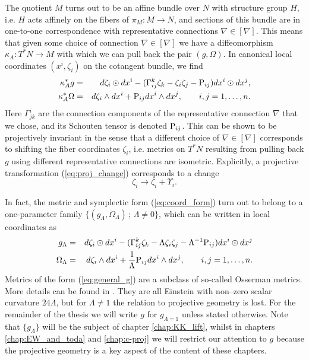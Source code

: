 \begin{rmk}
The quotient $M$ turns out to be an affine bundle over $N$ with
structure group $H$, i.e. $H$ acts affinely on the fibers of $\pi_M:M\rightarrow N$,
and sections of this bundle are in one-to-one correspondence with
representative connections $\nabla\in[\nabla]$. This means that given
some choice of connection $\nabla\in[\nabla]$ we have a diffeomorphism
$\kappa_A:T^{*}N\rightarrow M$ with which we can pull back the pair
$(g,\Omega)$. In canonical local coordinates $(x^{i},\zeta_{i})$ on
the cotangent bundle, we find
\begin{eqnarray}
\kappa_A^{*}g & = &  d\zeta_{i}\odot dx^{i}-(\Gamma_{ij}^{k}\zeta_{k}-\zeta_{i}\zeta_{j}-\mathrm{P}_{ij}) dx^{i}\odot dx^{j},\label{eq:coord_form}\\
\kappa_A^{*}\Omega & = &  d\zeta_{i}\wedge dx^{i}+\mathrm{P}_{ij} dx^{i}\wedge dx^{j},\qquad i,j=1,\dots ,n.\nonumber 
\end{eqnarray}
Here $\Gamma_{jk}^{i}$ are the connection components of the representative
connection $\nabla$ that we chose, and its Schouten tensor is denoted $\mathrm{P}_{ij}$. This can be shown to be projectively invariant
in the sense that a different choice of $\nabla\in[\nabla]$ corresponds
to shifting the fiber coordinates $\zeta_{i}$, i.e. metrics on $T^{*}N$
resulting from pulling back $g$ using different representative connections
are isometric. Explicitly, a projective transformation (\ref{eq:proj_change})
corresponds to a change
\begin{equation}
\zeta_{i}\longrightarrow \zeta_{i}+\Upsilon_{i}.\label{eq:zeta_change}
\end{equation}
\end{rmk}


\begin{rmk}
In fact, the metric and symplectic form (\ref{eq:coord_form}) turn
out to belong to a one-parameter family $\{(g_\Lambda,\Omega_\Lambda)\,;\,\Lambda\neq 0\}$, which
can be written in local coordinates as 
\begin{eqnarray}
g_{\Lambda} & = &  d\zeta_{i}\odot dx^{i}-(\Gamma_{ij}^{k}\zeta_{k}-\Lambda \zeta_{i}\zeta_{j}-\Lambda^{-1}\mathrm{P}_{ij}) dx^{i}\odot dx^{j}\label{eq:general_g}\\
\Omega_{\Lambda} & = &  d\zeta_{i}\wedge dx^{i}+\frac{1}{\Lambda}\mathrm{P}_{ij} dx^{i}\wedge dx^{j},\qquad i,j=1,\dots ,n.\label{eq:general_omega}
\end{eqnarray}
Metrics of the form (\ref{eq:general_g}) are a subclass of so-called
Osserman metrics. More details can be found in \cite{osserman}. They are all Einstein with non--zero scalar curvature $24\Lambda$, but for $\Lambda\neq1$ the relation to projective geometry is lost. For the remainder of the thesis we will write $g$ for $g_{\Lambda=1}$ unless stated otherwise. Note that $\{g_\Lambda\}$ will be the subject of chapter \ref{chap:KK_lift}, whilst in chapters  \ref{chap:EW_and_toda} and \ref{chap:c-proj} we will restrict our attention to $g$ because the projective geometry is a key aspect of the content of these chapters.
\end{rmk}



